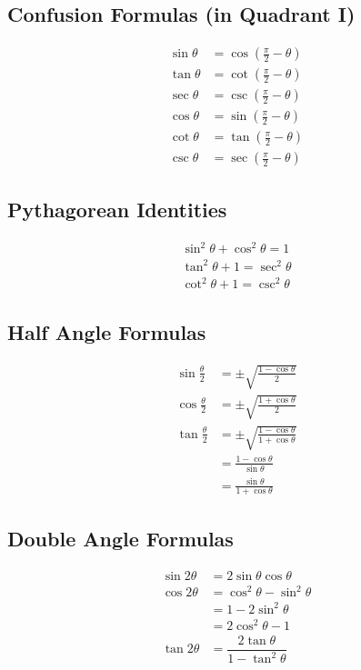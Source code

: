 \documentclass{article}
\begin{document}
	
	\subsection{Confusion Formulas (in Quadrant I)}
	\begin{align*}
		\sin{\theta} &= \cos{\left( \frac{\pi}{2} - \theta  \right)}\\
		\tan{\theta} &= \cot{\left( \frac{\pi}{2} - \theta  \right)}\\
		\sec{\theta} &= \csc{\left( \frac{\pi}{2} - \theta  \right)}\\		
		\cos{\theta} &= \sin{\left( \frac{\pi}{2} - \theta  \right)}\\
		\cot{\theta} &= \tan{\left( \frac{\pi}{2} - \theta  \right)}\\
		\csc{\theta} &= \sec{\left( \frac{\pi}{2} - \theta  \right)}
	\end{align*}
	
	
	\subsection{Pythagorean Identities}
	\begin{align*}
		\sin^2{\theta} + \cos^2{\theta} = 1\\
		\tan^2{\theta} + 1 = \sec^2{\theta} \\
		\cot^2{\theta} + 1 = \csc^2{\theta}
	\end{align*}
	
	
	
	\subsection{Half Angle Formulas}
	\begin{align*}
		\sin{\frac{\theta}{2}} &= \pm \sqrt{\frac{1 - \cos{\theta}}{2}}\\
		\cos{\frac{\theta}{2}} &= \pm \sqrt{\frac{1 + \cos{\theta}}{2}}\\
		\tan{\frac{\theta}{2}} &= \pm \sqrt{\frac{1 - \cos{\theta}}{1 + \cos{\theta}}}\\
								&= \frac{1-\cos{\theta}}{\sin{\theta}} \\
								&= \frac{\sin{\theta}}{1 + \cos{\theta}}
	\end{align*}
	
	
	\subsection{Double Angle Formulas}
	\begin{align*}
		\sin{2\theta} &= 2 \sin{\theta} \cos{\theta}\\
		\cos{2\theta} &= \cos^2{\theta} - \sin^2{\theta} \\
						&= 1 - 2 \sin^2{\theta} \\
						&= 2 \cos^2{\theta} - 1 \\
		\tan{2\theta} &= \dfrac{2\tan{\theta}}{1 - \tan^2{\theta}}
	\end{align*}
	
\end{document}
